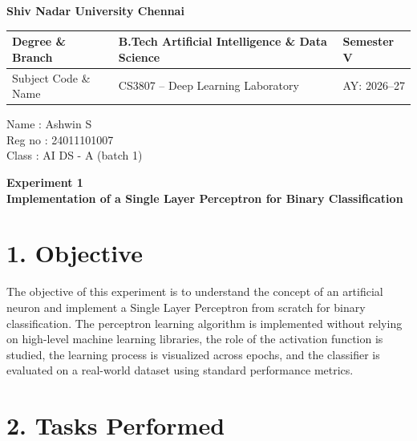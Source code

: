 \documentclass[11pt]{article}
\begin{document}
\begin{center}
\Large\textbf{Shiv Nadar University Chennai}\\[2mm]
\end{center}

\renewcommand{\arraystretch}{1.4}

\begin{tabular}{|p{3.5cm}|p{8cm}|p{2cm}|}
\hline
Degree \& Branch & B.Tech Artificial Intelligence \& Data Science & Semester V\\ \hline
Subject Code \& Name & CS3807 -- Deep Learning Laboratory & AY: 2026--27\\ \hline
\end{tabular}

Name : Ashwin S\\
Reg no : 24011101007\\
Class : AI DS - A (batch 1)\\

\vspace{3mm}

\begin{center}
\Large\textbf{Experiment 1}\\
\large\textbf{Implementation of a Single Layer Perceptron for Binary Classification}
\end{center}


\section*{1. Objective}

The objective of this experiment is to understand the concept of an artificial neuron and implement a Single Layer Perceptron from scratch for binary classification. The perceptron learning algorithm is implemented without relying on high-level machine learning libraries, the role of the activation function is studied, the learning process is visualized across epochs, and the classifier is evaluated on a real-world dataset using standard performance metrics.


\section*{2. Tasks Performed}
\end{document}
